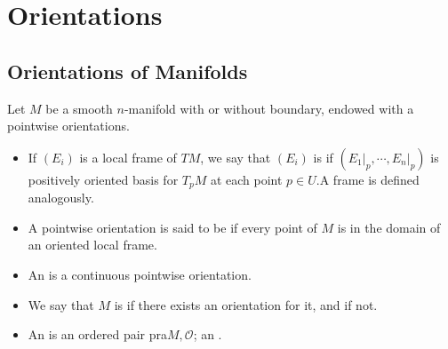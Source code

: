 \documentclass[../main.tex]{subfiles}
\begin{document}
\ifSubfilesClassLoaded{

    
}{}

\chapter{ Orientations }

\section{Orientations of Manifolds}

\begin{definition}{}{}
    Let \(  M  \) be a smooth \(  n  \)-manifold with or without boundary, endowed with a pointwise orientations.
    \begin{itemize}
        \item  If \(  \left( E_{i} \right)   \) is a local frame of \(  TM  \), we say that \(  \left( E_{i} \right)   \) is  if \(  \left( \left. E_1 \right|_{p},\cdots ,\left. E_{n} \right|_{p} \right)   \) is positively oriented basis for \(  T_{p}M  \) at each point \(  p\in U  \).A  frame is defined analogously.
        \item A pointwise orientation is said to be  if every point of \(  M  \) is in the domain of an oriented local frame.
        \item An  is a continuous pointwise orientation.
        \item We say that \(  M  \) is  if there exists an orientation for it, and  if not.
        \item An  is an ordered pair pra\(  M,\mathcal{O}  \); an .   
    \end{itemize}
            
\end{definition}
\end{document}
